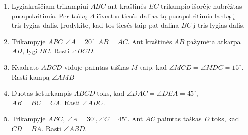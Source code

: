 \begin{enumerate}
\item Lygiakraščiam trikampiui $ABC$ ant kraštinės $BC$
  trikampio išorėje nubrėžtas pusapskritimis. Per tašką $A$
  išvestos tiesės dalina tą pusapskritimio lanką į tris
  lygias dalis. Įrodykite, kad tos tiesės taip pat dalina
  $BC$ į tris lygias dalis.
\item Trikampyje $ABC$ $\angle A=20^\circ$, $AB=AC$. Ant
  kraštinės $AB$ pažymėta atkarpa $AD$, lygi $BC$. Rasti
  $\angle BCD$. 
\item Kvadrato $ABCD$ viduje paimtas taškas $M$ taip, kad
  $\angle MCD=\angle MDC=15^\circ$. Rasti kampą $\angle AMB$
\item Duotas keturkampis $ABCD$ toks, kad $\angle DAC=\angle DBA=45^\circ$,
  $AB=BC=CA$. Rasti $\angle ADC$.
\item Trikampyje $ABC$, $\angle A=30^\circ, \angle C=45^\circ$.
  Ant $AC$ paimtas taškas $D$ toks, kad $CD=BA$. Rasti $\angle ABD$.
  

\end{enumerate}

